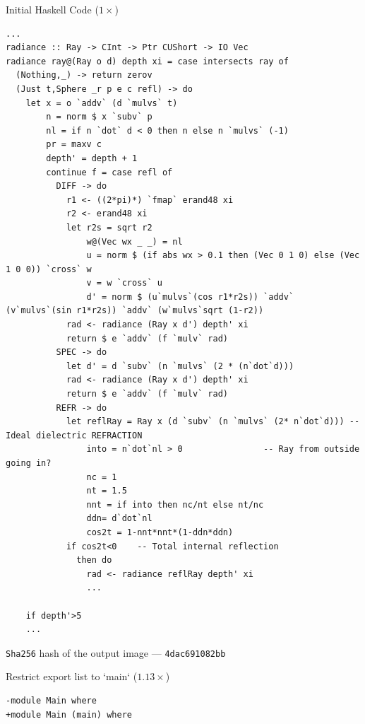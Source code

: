 \documentclass[8pt]{beamer}
\newcommand{\raw}[1]{\texttt{#1}}
\begin{document}

\begin{frame}[fragile]{Initial Haskell Code ($1\times$)}
\begin{verbatim}
...
radiance :: Ray -> CInt -> Ptr CUShort -> IO Vec
radiance ray@(Ray o d) depth xi = case intersects ray of
  (Nothing,_) -> return zerov
  (Just t,Sphere _r p e c refl) -> do
    let x = o `addv` (d `mulvs` t)
        n = norm $ x `subv` p
        nl = if n `dot` d < 0 then n else n `mulvs` (-1)
        pr = maxv c
        depth' = depth + 1
        continue f = case refl of
          DIFF -> do
            r1 <- ((2*pi)*) `fmap` erand48 xi
            r2 <- erand48 xi
            let r2s = sqrt r2
                w@(Vec wx _ _) = nl
                u = norm $ (if abs wx > 0.1 then (Vec 0 1 0) else (Vec 1 0 0)) `cross` w
                v = w `cross` u
                d' = norm $ (u`mulvs`(cos r1*r2s)) `addv` (v`mulvs`(sin r1*r2s)) `addv` (w`mulvs`sqrt (1-r2))
            rad <- radiance (Ray x d') depth' xi
            return $ e `addv` (f `mulv` rad)
          SPEC -> do
            let d' = d `subv` (n `mulvs` (2 * (n`dot`d)))
            rad <- radiance (Ray x d') depth' xi
            return $ e `addv` (f `mulv` rad)
          REFR -> do
            let reflRay = Ray x (d `subv` (n `mulvs` (2* n`dot`d))) -- Ideal dielectric REFRACTION
                into = n`dot`nl > 0                -- Ray from outside going in?
                nc = 1
                nt = 1.5
                nnt = if into then nc/nt else nt/nc
                ddn= d`dot`nl
                cos2t = 1-nnt*nnt*(1-ddn*ddn)
            if cos2t<0    -- Total internal reflection
              then do
                rad <- radiance reflRay depth' xi
                ...

    if depth'>5
    ...
\end{verbatim}
\raw{Sha256} hash of the output image --- \raw{4dac691082bb}
\end{frame}



\begin{frame}[fragile]{Restrict export list to `main` ($1.13\times$)}
\begin{verbatim}
-module Main where
+module Main (main) where
\end{verbatim}
\end{frame}
\end{document}

